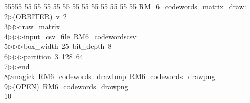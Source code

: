 %
%
\begin{tabbing}
55555 \= 55 \= 55 \= 55 \= 55 \= 55 \= 55 \= 55 \= 55 \= 55 \= 55 \= 55 \= 55 \= \>RM\_6\_codewords\_matrix\_draw:\\[0pt]
2\>$\triangleright$\>(ORBITER)\ v\ 2\ \\[0pt]
3\>$\triangleright$\>$\triangleright$\>draw\_matrix\ \\[0pt]
4\>$\triangleright$\>$\triangleright$\>$\triangleright$\>input\_csv\_file\ RM6\_codewordscsv\ \\[0pt]
5\>$\triangleright$\>$\triangleright$\>$\triangleright$\>box\_width\ 25\ bit\_depth\ 8\ \\[0pt]
6\>$\triangleright$\>$\triangleright$\>$\triangleright$\>partition\ 3\ 128\ 64\ \\[0pt]
7\>$\triangleright$\>$\triangleright$\>end\\[0pt]
8\>$\triangleright$\>magick\ RM6\_codewords\_drawbmp\ RM6\_codewords\_drawpng\\[0pt]
9\>$\triangleright$\>(OPEN)\ RM6\_codewords\_drawpng\\[0pt]
10\>\end{tabbing}

